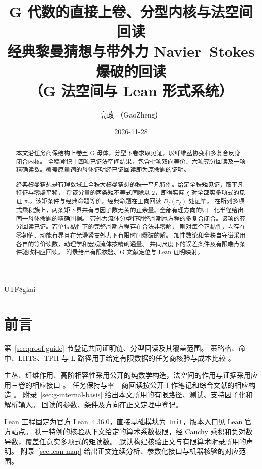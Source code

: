 \documentclass[12pt]{article}
\theoremstyle{definition}
\theoremstyle{remark}
\newcommand{\lean}[1]{\nolinkurl{#1}}
\begin{document}
\begin{CJK*}{UTF8}{gkai}
\renewcommand{\contentsname}{目录}
\renewcommand{\refname}{参考文献}
\renewcommand{\proofname}{证明}
\renewcommand{\abstractname}{摘要}
\renewcommand{\tablename}{表}
\title{G 代数的直接上卷、分型内核与法空间回读\\
\large 经典黎曼猜想与带外力 Navier--Stokes 爆破的回读\\
（G 法空间与 Lean 形式系统）}
\author{高政 （GaoZheng）}
\date{2026-11-28}
\maketitle
\begin{abstract}
本文沿任务商保结构上卷至 G 母体，分型下卷求取见证，以纤维丛协变和多复合反身闭合内核。
全稿登记十四项已证法空间结果，包含七项双向等价、六项充分回读及一项精确读数。覆盖原量词的母体证明经已证回读即为原命题的证明。

经典黎曼猜想是有理数域上全秩大黎曼猜想的秩一平凡特例。给定全秩矩见证，取平凡特征与零虚平移，
将该分量的两条矩不等式同除以 \(2\)，即得实际 \(\xi\) 对全部实多项式的见证 \(\pi_\zeta\)。该矩条件与经典命题等价，经典命题在正向回读 \(D_\zeta(\pi_\zeta)\) 处证毕。
在所列多项式乘积族上，两条矩下界共有与因子数无关的正余量。全部有理方向的归一化半径给出同一母体命题的精确判据。
带外力流体分型证明整周期尾方程的多复合闭合。该项的充分回读已证。若单位黏性下的完整周期方程存在合法非零解，
则对每个正黏性，均存在零初值、动能有界且在光滑紧支外力下有限时间爆破的解。
加性数论和全秩自守谱采用各自的等价读数，动理学和宏观流体按精确通量、
共同尺度下的误差条件及有限端点条件验收相应回读。
附录给出有限核验、G 文献定位与 Lean 证明映射。
\end{abstract}

\section*{前言}
第~\ref{sec:proof-guide} 节登记共同证明链、分型回读及其覆盖范围。
策略格、命中、LHTS、TPH 与 L-路径用于给定有限数据的任务商核验与成本比较
\cite{GNotes,GUnified}。

主丛、纤维作用、高阶相容性采用公开的纯数学构造，法空间的作用与证据采用应用三卷的相应接口
\cite{GPure,GAppI,GAppII,GAppIII}。
任务保持与率—商回读按公开工作笔记和综合文献的相应构造 \cite{GNotes,GUnified}。
附录~\ref{sec:g-internal-basis} 给出本文所用的有限路径、测试、支持因子化和解析输入。
回读的参数、条件及方向在正文定理中登记。

Lean 工程固定为官方 Lean~4.36.0，直接基础模块为 \lean{Init}，版本入口见 \href{https://lean-lang.org/}{Lean 官方站点}。
秩一特例的核验从下文给定的算术系数极限，经 Cauchy 乘积和负对数导数，覆盖任意实多项式的矩读数。
默认构建核验正文与有限算术附录所用的声明。
附录~\ref{sec:lean-map} 给出正文连续分析、参数化接口与机器核验的对应范围。


\end{CJK*}
\end{document}
